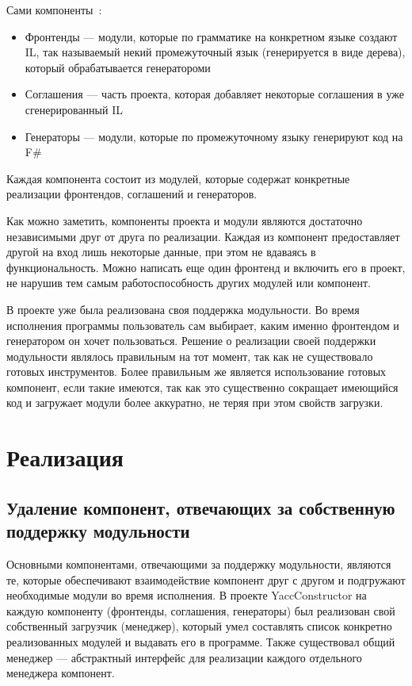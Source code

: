 Сами компоненты~\cite{YC_article}:
\begin{itemize}
\item Фронтенды --- модули, которые по грамматике на конкретном языке создают IL, так называемый некий промежуточный язык (генерируется в виде дерева), который обрабатывается генератороми
\item Соглашения  --- часть проекта, которая добавляет некоторые соглашения в уже сгенерированный IL
\item Генераторы --- модули, которые по промежуточному языку генерируют код на F\#
\end{itemize}

Каждая компонента состоит из модулей, которые содержат конкретные реализации фронтендов, соглашений и генераторов.

Как можно заметить, компоненты проекта и модули являются достаточно независимыми друг от друга по реализации. Каждая из компонент предоставляет другой на вход лишь некоторые данные, при этом не вдаваясь в функциональность. Можно написать еще один фронтенд и  включить его в проект, не нарушив тем самым работоспособность других модулей или компонент.

В проекте уже была реализована своя поддержка модульности. Во время исполнения программы пользователь сам выбирает, каким именно фронтендом и генератором он хочет пользоваться. Решение о реализации своей поддержки модульности являлось правильным на тот момент, так как не существовало готовых инструментов. Более правильным же является использование готовых компонент, если такие имеются, так как это существенно сокращает имеющийся код и загружает модули более аккуратно, не теряя при этом свойств загрузки.



\section{Реализация}
\subsection {Удаление компонент, отвечающих за собственную \\поддержку модульности}
Основными компонентами, отвечающими за поддержку модульности, являются те, которые обеспечивают взаимодействие компонент друг с другом и подгружают необходимые модули во время исполнения.
В проекте YaccConstructor на каждую компоненту (фронтенды, соглашения, генераторы) был реализован свой собственный загрузчик (менеджер), который умел составлять список конкретно реализованных модулей и выдавать его в программе. Также существовал общий менеджер --- абстрактный интерфейс для реализации каждого отдельного менеджера компонент.

